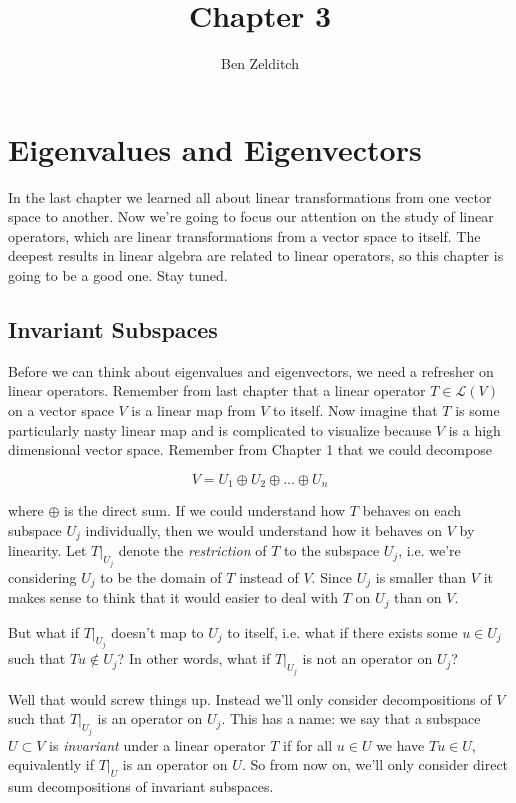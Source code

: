 \documentclass[12pt]{article}
\title{Chapter 3}
\author{Ben Zelditch}
\begin{document}
\maketitle

\section*{Eigenvalues and Eigenvectors}

In the last chapter we learned all about linear transformations from one vector space to another. Now we're going to focus our attention on the study
of linear operators, which are linear transformations from a vector space to itself. The deepest results in linear algebra are related to linear operators, so this chapter
is going to be a good one. Stay tuned.

\subsection*{Invariant Subspaces}

Before we can think about eigenvalues and eigenvectors, we need a refresher on linear operators. Remember from last chapter that a linear operator $T \in \mathcal{L} (V)$ on a vector space $V$ is a linear map from $V$ to itself. Now imagine that $T$ is some particularly nasty linear map and is complicated to visualize because $V$ is a high dimensional vector space. Remember from Chapter 1 that we could decompose

$$V = U_1 \oplus U_2 \oplus \dots \oplus U_n$$

where $\oplus$ is the direct sum. If we could understand how $T$ behaves on each subspace $U_j$ individually, then we would understand how it behaves on $V$ by linearity. Let $T|_{U_j}$ denote the \textit{restriction} of $T$ to the subspace $U_j$, i.e. we're considering $U_j$ to be the domain of $T$ instead of $V$. Since $U_j$ is smaller than $V$ it makes sense to think that it would easier to deal with $T$ on $U_j$ than on $V$.

But what if $T|_{U_j}$ doesn't map to $U_j$ to itself, i.e. what if there exists some $u \in U_j$ such that $Tu \notin U_j$? In other words, what if $T|_{U_j}$ is not an operator on $U_j$?

Well that would screw things up. Instead we'll only consider decompositions of $V$ such that $T|_{U_j}$ is an operator on $U_j$. This has a name:  we say that a subspace $U \subset V$ is \textit{invariant} under a linear operator $T$ if for all $u \in U$ we have $Tu \in U$, equivalently if $T|_U$ is an operator on $U$. So from now on, we'll only consider direct sum decompositions of invariant subspaces.
\end{document}

